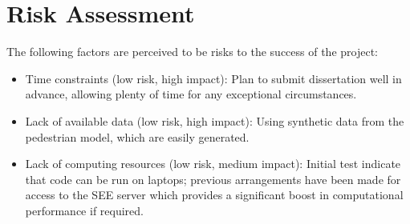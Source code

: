 \documentclass[12pt, twoside, a4paper]{article}
\begin{document}
\section{Risk Assessment}\label{sec:risk_ass}

The following factors are perceived to be risks to the success of the project:
\begin{itemize}
    \item Time constraints (low risk, high impact): Plan to submit dissertation well in
        advance, allowing plenty of time for any exceptional circumstances.
    \item Lack of available data (low risk, high impact): Using synthetic data
        from the pedestrian model, which are easily generated.
    \item Lack of computing resources (low risk, medium impact): Initial test
        indicate that code can be run on laptops; previous arrangements have
        been made for access to the SEE server which provides a significant
        boost in computational performance if required.
\end{itemize}






\end{document}
